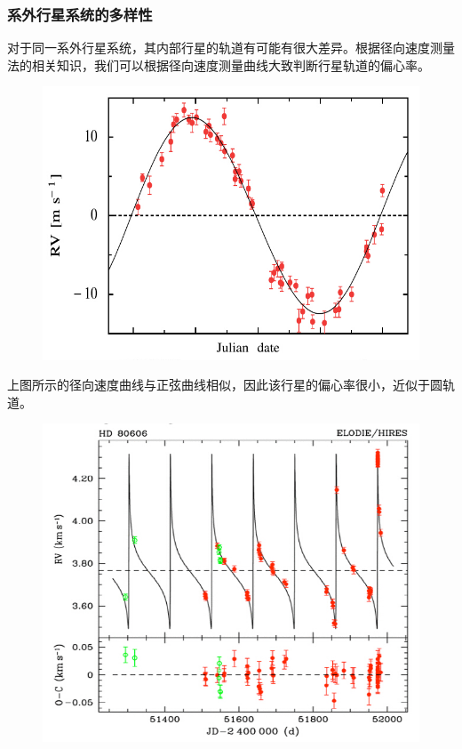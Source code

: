 \documentclass[letterpaper,10pt,english]{sphinxmanual}
\begin{document}
\subsubsection{系外行星系统的多样性}
\label{statistics:id6}
对于同一系外行星系统，其内部行星的轨道有可能有很大差异。根据径向速度测量法的相关知识，我们可以根据径向速度测量曲线大致判断行星轨道的偏心率。
\begin{figure}[htbp]
\centering

\includegraphics{small_eccentricity.jpg}
\end{figure}

上图所示的径向速度曲线与正弦曲线相似，因此该行星的偏心率很小，近似于圆轨道。
\begin{figure}[htbp]
\centering

\includegraphics{large_eccentricity.jpg}
\end{figure}
\end{document}
